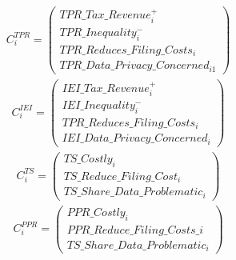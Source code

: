 \documentclass[11pt]{article}
\begin{document}
\begin{center}
{\[\begin{array}{ccc}
\end{array}
\]
}
\vspace{2em}
{\small
\[
\begin{array}{ccc}

C_i^{TPR} =
\left(
\begin{array}{c}
TPR\_Tax\_Revenue_i^+ \\
TPR\_Inequality_i^- \\
TPR\_Reduces\_Filing\_Costs_i \\
TPR\_Data\_Privacy\_Concerned_{i1}
\end{array}
\right)

\end{array}
\]
}
\vspace{2em}
{\small
\[
\begin{array}{ccc}

C_i^{IEI} =
\left(
\begin{array}{c}
IEI\_Tax\_Revenue_i^+ \\
IEI\_Inequality_i^- \\
TPR\_Reduces\_Filing\_Costs_i \\
IEI\_Data\_Privacy\_Concerned_i
\end{array}
\right)

\end{array}
\]
}
\vspace{2em}
{\small
\[
\begin{array}{ccc}

C_i^{TS} =
\left(
\begin{array}{c}
TS\_Costly_i \\
TS\_Reduce\_Filing\_Cost_i \\
TS\_Share\_Data\_Problematic_i
\end{array}
\right)

\end{array}
\]
}
\vspace{2em}
{\small
\[
\begin{array}{ccc}

C_i^{PPR} =
\left(
\begin{array}{c}
PPR\_Costly_i \\
PPR\_Reduce\_Filing\_Costs\_i \\
TS\_Share\_Data\_Problematic_i
\end{array}
\right)

\end{array}
\]
}
\vspace{2em}
{\small
\[
\begin{array}{ccc}

\\[2em]


\end{array}\]}
\end{center}
\end{document}
